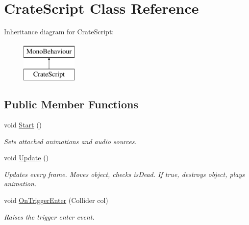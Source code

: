 \hypertarget{classCrateScript}{\section{Crate\-Script Class Reference}
\label{classCrateScript}
}
Inheritance diagram for Crate\-Script\-:\begin{figure}[H]
\begin{center}
\leavevmode
\includegraphics[height=2.000000cm]{classCrateScript}
\end{center}
\end{figure}
\subsection*{Public Member Functions}
\begin{DoxyCompactItemize}
\item 
void \hyperlink{classCrateScript_a41369f02a813b8cd1a159729eaf32345}{Start} ()
\begin{DoxyCompactList}\small\item\em Sets attached animations and audio sources. \end{DoxyCompactList}\item 
void \hyperlink{classCrateScript_a4637e9037a22692af83dd1e5230b04fd}{Update} ()
\begin{DoxyCompactList}\small\item\em Updates every frame. Moves object, checks is\-Dead. If true, destroys object, plays animation. \end{DoxyCompactList}\item 
void \hyperlink{classCrateScript_a342f9ebf5e1aa11849dbd97b2694cf72}{On\-Trigger\-Enter} (Collider col)
\begin{DoxyCompactList}\small\item\em Raises the trigger enter event. \end{DoxyCompactList}\end{DoxyCompactItemize}
